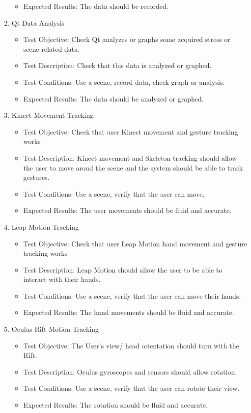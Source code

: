 \documentclass[a4paper,10pt]{article}
\begin{document}
\begin{enumerate}
\begin{itemize}
	\item Expected Results: The data should  be recorded.
    \end{itemize}
    \item  Qt Data Analysis
     \begin{itemize}
	\item Test Objective: Check Qt analyzes or graphs some acquired stress or scene related data.
	\item Test Description: Check that this data is analyzed or graphed.
	\item Test Conditions: Use a scene, record data, check graph or analysis.
	\item Expected Results: The data should  be analyzed or graphed.
    \end{itemize}
     \item Kinect Movement Tracking
     \begin{itemize}
	\item Test Objective: Check that user Kinect movement and gesture tracking works
	\item Test Description: Kinect movement and Skeleton tracking should allow the user to move aroud the scene and the system should be able to track gestures.
	\item Test Conditions: Use a scene, verify that the user can move.
	\item Expected Results: The user movements should be fluid and accurate.
    \end{itemize}
     \item Leap Motion Tracking
     \begin{itemize}
	\item Test Objective: Check that user Leap Motion hand movement and gesture tracking works
	\item Test Description: Leap Motion should allow the user to be able to interact with their hands.
	\item Test Conditions: Use a scene, verify that the user can move their hands.
	\item Expected Results: The hand movements should be fluid and accurate.
    \end{itemize}
     \item Oculus Rift Motion Tracking
     \begin{itemize}
	\item Test Objective: The User's view/ head orientation should turn with the Rift.
	\item Test Description: Oculus gyroscopes and sensors should allow rotation.
	\item Test Conditions: Use a scene, verify that the user can rotate their view.
	\item Expected Results: The rotation should be fluid and accurate.
    \end{itemize}
     
\end{enumerate}
\end{document}

